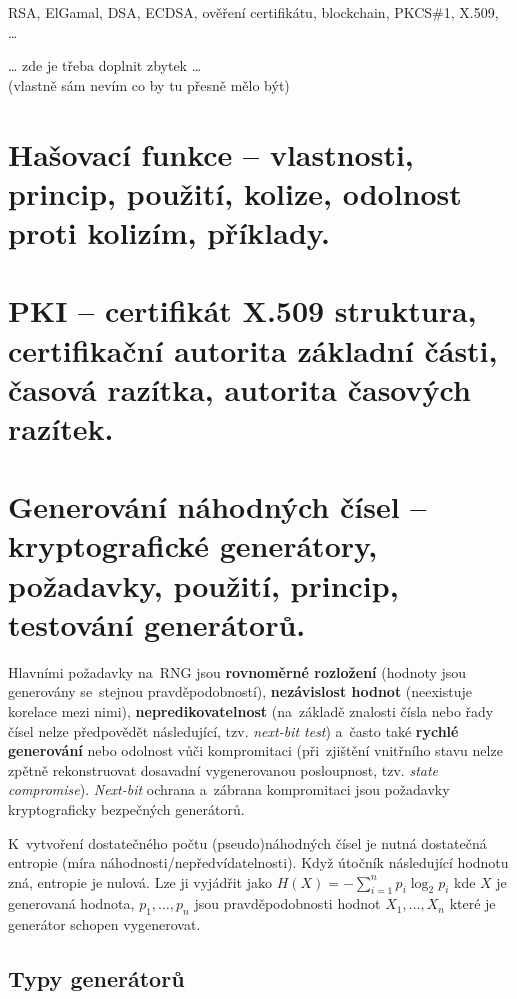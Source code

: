 RSA, ElGamal, DSA, ECDSA, ověření certifikátu, blockchain, PKCS\#1, X.509, \dots

\begin{center}
{\huge \dots} zde je třeba doplnit zbytek {\huge \dots} \\
(vlastně sám nevím co by tu přesně mělo být)
\end{center}

\clearpage
\section{Hašovací funkce -- vlastnosti, princip, použití, kolize, odolnost proti kolizím, příklady.}



\clearpage
\section{PKI -- certifikát X.509 struktura, certifikační autorita základní části, časová razítka, autorita časových razítek.}

\clearpage
\section{Generování náhodných čísel -- kryptografické generátory, požadavky, použití, princip, testování generátorů.}

Hlavními požadavky na~RNG jsou \textbf{rovnoměrné rozložení} (hodnoty jsou generovány se~stejnou pravděpodobností), \textbf{nezávislost hodnot} (neexistuje korelace mezi nimi), \textbf{nepredikovatelnost} (na~základě znalosti čísla nebo řady čísel nelze předpovědět následující, tzv. \emph{next-bit test}) a~často také \textbf{rychlé generování} nebo odolnost vůči kompromitaci (při~zjištění vnitřního stavu nelze zpětně rekonstruovat dosavadní vygenerovanou posloupnost, tzv. \emph{state compromise}). \emph{Next-bit} ochrana a~zábrana kompromitaci jsou požadavky kryptograficky bezpečných generátorů.

K~vytvoření dostatečného počtu (pseudo)náhodných čísel je nutná dostatečná entropie (míra náhodnosti/nepředvídatelnosti). Když útočník následující hodnotu zná, entropie je nulová. Lze ji vyjádřit jako $H(X) = - \sum_{i=1}^{n} p_i \log_2 p_i$ kde $X$ je generovaná hodnota, $p_1, \dots, p_n$ jsou pravděpodobnosti hodnot $X_1, \dots, X_n$ které je generátor schopen vygenerovat.

\subsection{Typy generátorů}

